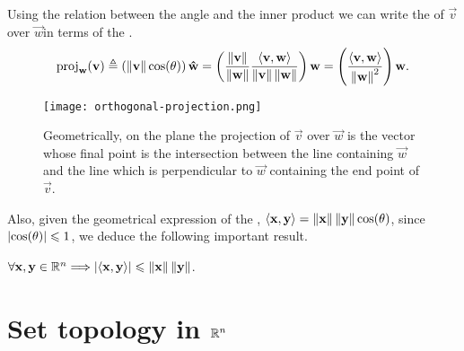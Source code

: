 Using the relation between the angle and the inner product we can write the  of $\vec{v}$ 
over $\vec{w} $in terms of the .
\begin{equation}
    \ovproj{\vec{w}}{\vec{v}}\bydef\left(\vnorm{\vec{v}}\cos(\theta)\right)\uvec{w} = \left(\frac{\vnorm{\vec{v}}}{\vnorm{\vec{w}}}
    \frac{\innerp{\vec{v}, \vec{w}}}{\vnorm{\vec{v}}\vnorm{\vec{w}}}\right)\vec{w} = \left(\frac{\innerp{\vec{v}, 
    \vec{w}}}{\vnorm{\vec{w}}^2}
\right)\vec{w}.
\end{equation}
\newpage
\begin{figure}[htbp]\label{fig:ortho-proj}
    \centerline{\texttt{[image: orthogonal-projection.png]}}
    \caption{Geometrically, on the plane the projection of $\vec{v}$ over $\vec{w}$ is the vector whose final point is the intersection
between the line containing $\vec{w}$ and the line which is perpendicular to $\vec{w}$ containing the end point of $\vec{v}$.}
\end{figure}

Also, given the geometrical expression of the , $\langle \mathbf{x}, \mathbf{y} \rangle = \left\Vert \mathbf{x} \right\Vert
\left\Vert \mathbf{y} \right\Vert\cos(\theta)$, since $\abs{\cos(\theta)}\leqslant 1$, we deduce the following important result.
\begin{lemma}
$\forall\vec{x}, \vec{y}\in\Rtn \implies \abs{\innerp{\vec{x}, \vec{y}}}\leq \vnorm{\vec{x}}\vnorm{\vec{y}}$.
\end{lemma}



\section{Set topology in $\Rtn$}

